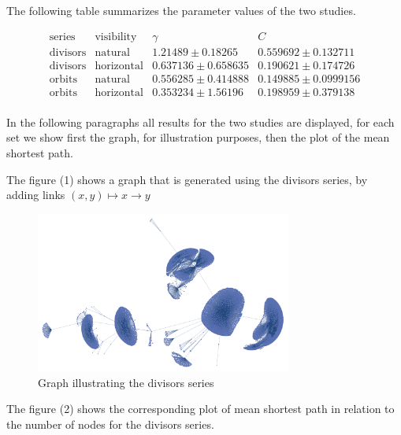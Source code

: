 \documentclass[a4paper,12pt]{article}
\begin{document}
The following table summarizes the parameter values of the two studies.

\begin{equation}
    \begin{array}{l|l|c|c}
       \textrm{series} & \textrm{visibility} & \gamma & C \\
        \hline
        \textrm{divisors} & \textrm{natural} & 1.21489 \pm 0.18265 & 0.559692 \pm 0.132711 \\
        \textrm{divisors} & \textrm{horizontal} & 0.637136 \pm 0.658635 & 0.190621 \pm 0.174726 \\
        \textrm{orbits} & \textrm{natural} & 0.556285 \pm 0.414888 & 0.149885 \pm 0.0999156 \\
        \textrm{orbits} & \textrm{horizontal} & 0.353234 \pm 1.56196 & 0.198959 \pm 0.379138 \\
    \end{array}
\end{equation}


In the following paragraphs all results for the two studies are displayed,
for each set we show first the graph, for illustration purposes, 
then the plot of the mean shortest path.


The figure (1) shows a graph that is generated using the divisors
series, by adding links $(x,y)\mapsto x\to y$

\begin{figure}[h!]
    \centering
    \includegraphics[width=0.75\textwidth]{divisors.pdf}
    \caption{Graph illustrating the divisors series}
    \label{graphs}
\end{figure}


The figure (2) shows the corresponding plot of mean shortest path
in relation to the number of nodes for the divisors series.
\end{document}

